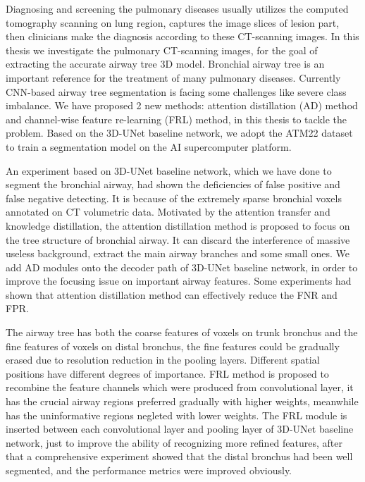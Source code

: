 \begin{abstract*}

  Diagnosing and screening the pulmonary diseases usually utilizes the computed tomography scanning on lung region, captures the image slices of 
  lesion part, then clinicians make the diagnosis according to these CT-scanning images.
  In this thesis we investigate the pulmonary CT-scanning images, for the goal of extracting the accurate airway tree 3D model. Bronchial airway
  tree is an important reference for the treatment of many pulmonary diseases. Currently CNN-based airway tree segmentation is facing 
  some challenges like severe class imbalance. We have proposed 2 new methods: attention distillation (AD) method 
  and channel-wise feature re-learning (FRL) method, in this thesis to tackle the problem. Based on the 3D-UNet baseline network, we adopt the 
  ATM22 dataset to train a segmentation model on the AI supercomputer platform.

  An experiment based on 3D-UNet baseline network, which we have done to segment the bronchial airway, had shown the deficiencies of false positive and false negative detecting.
  It is because of the extremely sparse bronchial voxels annotated on CT volumetric data. 
  Motivated by the attention transfer and knowledge distillation, the attention distillation method is proposed to focus on the tree structure of bronchial
  airway. It can discard the interference of massive useless background, extract the main airway branches and some small ones. We add AD modules onto the decoder
  path of 3D-UNet baseline network, in order to improve the focusing issue on important airway features. 
  Some experiments had shown that attention distillation method can effectively reduce the FNR and FPR.

  The airway tree has both the coarse features of voxels on trunk bronchus and the fine features of voxels on distal bronchus, the fine features could be gradually erased due to resolution reduction in the pooling layers. Different spatial positions have different degrees of importance. FRL method is proposed to recombine the feature channels which 
  were produced from convolutional layer, it has the crucial airway regions preferred gradually with higher weights, meanwhile has the uninformative regions negleted with lower weights.
  The FRL module is inserted between each convolutional layer and pooling layer of 3D-UNet baseline network, just to improve the ability of recognizing more refined features, 
  after that a comprehensive experiment showed that the distal bronchus had 
  been well segmented, and the performance metrics were improved obviously.

\end{abstract*}

